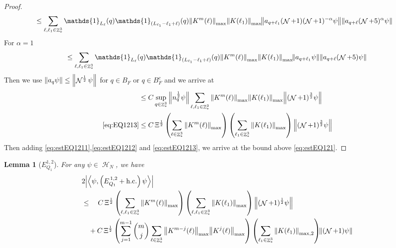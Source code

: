 \documentclass[sn-mathphys, Numbered ,a4paper]{sn-jnl}%
\DeclareMathOperator{\Z}{\mathbb{Z}}
\DeclareMathOperator{\HH}{\mathcal{H}}
\DeclareMathOperator{\NN}{\mathcal{N}}
\newcommand{\half}{\frac{1}{2}}
\newcommand{\eva}[1]{\left\langle #1 \right\rangle}
\theoremstyle{plain}
\newtheorem{lemma}[theorem]{Lemma}
\theoremstyle{definition}
\theoremstyle{remark}
\theoremstyle{plain}
\theoremstyle{definition}
\theoremstyle{remark}
\begin{document}
\begin{proof}
\begin{align}
	&\leq\sum\limits_{\ell, \ell_1\in \Z^3_*} \mathds{1}_{L_{\ell}}(q) \mathds{1}_{(L_{\ell_1}-\ell_1+\ell)}(q)\norm{K^m(\ell)}_{\mathrm{max}} \norm{ K(\ell_1)}_{\mathrm{max}} \! \norm{ a_{q+\ell_1} (\NN+1) (\NN+1)^{-\alpha} \psi} \norm{ a_{q+\ell} (\NN+5)^{\alpha} \psi }\nonumber
\end{align}
For $\alpha=1$
\begin{equation}
	\leq\sum\limits_{\ell, \ell_1\in \Z^3_*} \mathds{1}_{L_{\ell}}(q)  \mathds{1}_{(L_{\ell_1}-\ell_1+\ell)}(q)\norm{K^m(\ell)}_{\mathrm{max}} \norm{ K(\ell_1)}_{\mathrm{max}} \! \norm{ a_{q+\ell_1} \psi} \norm{ a_{q+\ell} (\NN+5) \psi} \nonumber
\end{equation} 
Then we use $\norm{a_q\psi}\leq \norm{\NN^\half\psi}$ for $q \in B_F$ or $q \in B^c_F$ and we arrive at 
\begin{align}
	&\leq C \sup\limits_{q \in \Z^3_*} \norm{ n^\half_{q} \psi}\sum\limits_{\ell, \ell_1\in \Z^3_*} \norm{K^m(\ell)}_{\mathrm{max}} \norm{ K(\ell_1)}_{\mathrm{max}} \norm{ (\NN+1)^{\frac{3}{2}} \psi } \nonumber\\
	\eqref{eq:EQ1213}&\leq  C \,\Xi^\half \left(\sum\limits_{\ell \in \Z^3_*} \norm{K^m(\ell)}_{\mathrm{max}}\right)\left( \sum\limits_{\ell_1\in \Z^3_*} \norm{ K(\ell_1)}_{\mathrm{max}} \right) \norm{ (\NN+1)^{\frac{3}{2}} \psi }\label{eq:estEQ1213}
\end{align}
Then adding \eqref{eq:estEQ1211},\eqref{eq:estEQ1212} and \eqref{eq:estEQ1213}, we arrive at the bound above \eqref{eq:estEQ121}.
\end{proof}
\begin{lemma}[$E_{Q_1}^{1,2}$]
For any $\psi \in \HH_N$, we have
\begin{align}
	&2\abs{\eva{\psi,\left(E^{\,1,2}_{Q_1}+\mathrm{h.c.}\right) \psi }}\nonumber\\
	&\leq\quad C\, \Xi^{\half} \left(\sum\limits_{\ell, \ell_1\in \Z^3_*} \norm{K^m(\ell)}_{\mathrm{max}}  \right) \left(\sum\limits_{\ell, \ell_1\in \Z^3_*} \norm{K(\ell_1)}_{\mathrm{max}} \right) \norm{(\NN+1)^{\half} \psi} \nonumber\\
	&\quad + C\, \Xi^{\half} \left(  \sum\limits_{j=1}^{m-1} {{m}\choose j} \sum\limits_{\ell \in \Z^3_*} \norm{K^{m-j}(\ell)}_{\mathrm{max}} \norm{ K^{j}(\ell)}_{\mathrm{max}}\right) \left( \sum\limits_{ \ell_1\in \Z^3_*}\norm{ K(\ell_1) }_{\mathrm{max},2} \right)\!\! \norm{(\NN+1) \psi } \label{eq:estEQ112}
\end{align}
\end{lemma}
\end{document}

